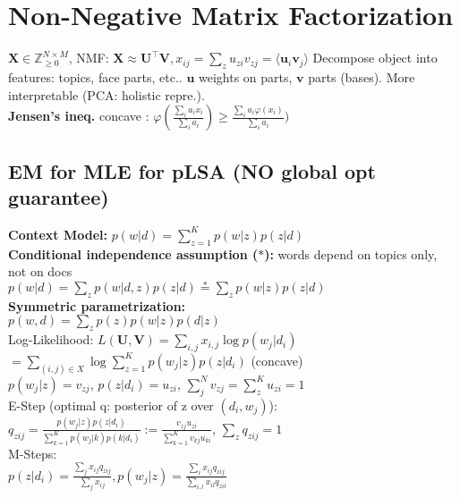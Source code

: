 \section{Non-Negative Matrix Factorization}
$\mathbf{X} \in \mathbb{Z}^{N \times M}_{\geq 0}$, NMF: $\mathbf{X} \approx \mathbf{U^\top V}, x_{ij}=\sum_z{u_{zi}v_{zj}}=\langle\mathbf{u}_i \mathbf{v}_j\rangle$
Decompose object into features: topics, face parts, etc.. $\mathbf{u}$ weights on parts, $\mathbf{v}$ parts (bases). More interpretable (PCA: holistic repre.).\\
\textbf{Jensen's ineq.} concave : $\varphi \left(\frac{\sum_i a_ix_i}{\sum_i a_i}\right) \geq \frac{\sum_i a_i \varphi( x_i)}{\sum_i a_i})$
\subsection*{EM for MLE for pLSA (NO global opt guarantee)}
\textbf{Context Model:} $p(w | d) = \sum_{z=1}^K p(w | z) p(z | d)$\\
\textbf{Conditional independence assumption ($*$):} words depend on topics only, not on docs\\
$p(w|d) = \sum_z p(w|d,z)p(z|d) \stackrel{*}{=} \sum_z p(w|z)p(z|d)$\\
\textbf{Symmetric parametrization:}\\
$p(w, d) = \sum_z p(z)p(w | z) p(d | z)$ \\
Log-Likelihood: $L(\mathbf{U}, \mathbf{V}) = \sum_{i,j} x_{i,j}\log p(w_j|d_i)$ \\
$= \sum_{(i,j) \in X} \log \sum_{z=1}^K p(w_j|z)p(z|d_i)$ (concave) \\ 
$ p(w_j|z) = v_{zj}$, $p(z|d_i) = u_{zi}$, $\sum_j^N v_{zj} = \sum_z^K u_{zi} = 1$\\
E-Step (optimal q: posterior of z over $(d_i, w_j)$):\\
$q_{zij} = \frac{p(w_j|z)p(z|d_i)}{\sum_{k=1}^K p(w_j|k)p(k|d_i)} := \frac{v_{zj}u_{zi}}{\sum_{k=1}^K v_{kj}u_{ki}}$, $\sum_z q_{zij}=1$\\
M-Steps:\\
$p(z|d_i) = \frac{\sum_j x_{ij}q_{zij}}{\sum_j x_{ij}}, p(w_j|z) = \frac{\sum_i x_{ij}q_{zij}}{\sum_{i,l}x_{il}q_{zil}}$\\

